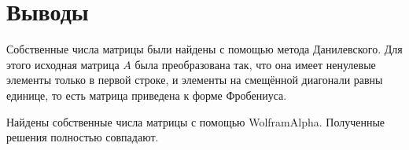 \chapter*{Выводы}

Собственные числа матрицы были найдены с помощью метода Данилевского.
Для этого исходная матрица $A$ была преобразована так,
что она имеет ненулевые элементы только в первой строке,
и элементы на смещённой диагонали равны единице, то есть матрица приведена к форме Фробениуса.

Найдены собственные числа матрицы с помощью WolframAlpha.
Полученные решения полностью совпадают.


